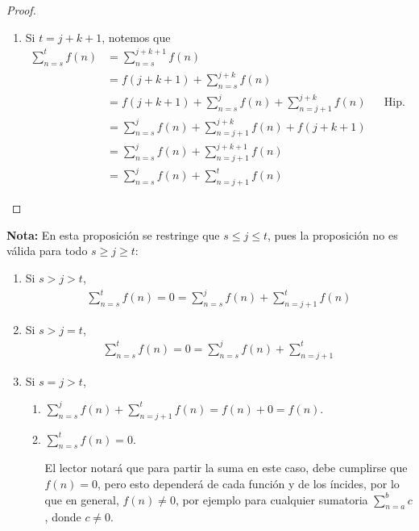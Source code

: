 \begin{enumerate}[label=\alph*)]
\begin{proof}
\begin{enumerate}[label=\Roman*)]
\begin{enumerate}[label=\roman*)]
          \item Si $t=j+k+1$, notemos que
          \begin{align*}
            \sum_{n=s}^{t}f(n) &= \sum_{n=s}^{j+k+1}f(n)\\
            &= f(j+k+1) + \sum_{n=s}^{j+k}f(n)\\
            &= f(j+k+1) + \sum_{n=s}^{j}f(n) + \sum_{n=j+1}^{j+k}f(n) && \text{Hip. Ind.}\\
            &= \sum_{n=s}^{j}f(n) + \sum_{n=j+1}^{j+k}f(n) +f(j+k+1)\\
            &= \sum_{n=s}^{j}f(n) + \sum_{n=j+1}^{j+k+1}f(n)\\
            &= \sum_{n=s}^{j}f(n) + \sum_{n=j+1}^{t}f(n)
          \end{align*}
        \end{enumerate}
    \end{enumerate}
  \end{proof}

  \textbf{Nota:} En esta proposición se restringe que $s\leq j\leq t$, pues la proposición no es válida para todo $s\geq j\geq t$:
  \begin{enumerate}[label=\Roman*)]
  \item Si $s>j>t$,
  \begin{align*}
    \sum_{n=s}^{t} f(n) = 0 = \sum_{n=s}^{j} f(n) + \sum_{n=j+1}^{t} f(n)
  \end{align*}

  \item Si $s>j=t$,
  \begin{align*}
    \sum_{n=s}^{t} f(n)= 0 = \sum_{n=s}^{j} f(n) + \sum_{n=j+1}^{t}
  \end{align*}

  \item Si $s=j>t$,
  \begin{enumerate}[label=\roman*)]
    \item $\sum_{n=s}^{j} f(n) + \sum_{n=j+1}^{t} f(n) = f(n) + 0 = f(n)$.
    \item $\sum_{n=s}^{t} f(n) = 0$.
    
    El lector notará que para partir la suma en este caso, debe cumplirse que $f(n)=0$, pero esto dependerá de cada función y de los íncides, por lo que en general, $f(n)\neq 0$, por ejemplo para cualquier sumatoria $\sum_{n=a}^{b} c$, donde $c\neq 0$.

  \end{enumerate}


\end{enumerate}
\end{enumerate}
